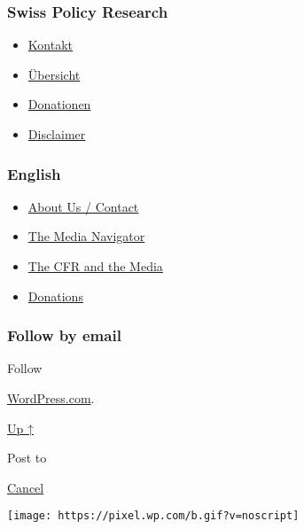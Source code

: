 \hypertarget{swiss-policy-research}{%
\subsubsection{Swiss Policy Research}\label{swiss-policy-research}}

\begin{itemize}
\tightlist
\item
  \href{https://swprs.org/kontakt/}{Kontakt}
\item
  \href{https://swprs.org/uebersicht/}{Übersicht}
\item
  \href{https://swprs.org/donationen/}{Donationen}
\item
  \href{https://swprs.org/disclaimer/}{Disclaimer}
\end{itemize}

\hypertarget{english}{%
\subsubsection{English}\label{english}}

\begin{itemize}
\tightlist
\item
  \href{https://swprs.org/contact/}{About Us / Contact}
\item
  \href{https://swprs.org/media-navigator/}{The Media Navigator}
\item
  \href{https://swprs.org/the-american-empire-and-its-media/}{The CFR
  and the Media}
\item
  \href{https://swprs.org/donations/}{Donations}
\end{itemize}

\hypertarget{follow-by-email}{%
\subsubsection{Follow by email}\label{follow-by-email}}

Follow

\href{https://wordpress.com/?ref=footer_custom_com}{WordPress.com}.

\protect\hyperlink{}{Up ↑}

Post to

\protect\hyperlink{}{Cancel}

\texttt{[image: https://pixel.wp.com/b.gif?v=noscript]}

